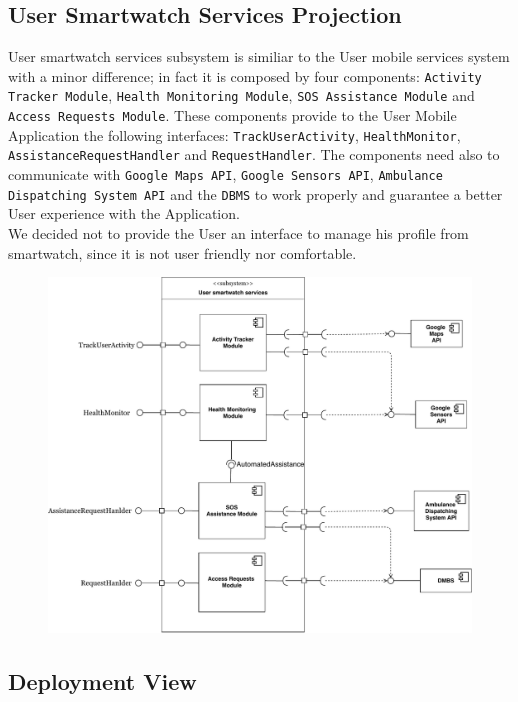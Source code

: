 \documentclass[12pt,a4paper]{article}
\begin{document}
		\subsection{User Smartwatch Services Projection}
	User smartwatch services subsystem is similiar to the User mobile services system with a minor difference; in fact it is composed by four components: \texttt{Activity Tracker Module}, \texttt{Health Monitoring Module}, \texttt{SOS Assistance Module} and \texttt{Access Requests Module}. These components provide to the User Mobile Application the following interfaces: \texttt{TrackUserActivity}, \texttt{HealthMonitor}, \texttt{AssistanceRequestHandler} and \texttt{RequestHandler}. The components need also to communicate with \texttt{Google Maps API}, \texttt{Google Sensors API}, \texttt{Ambulance Dispatching System API} and the \texttt{DBMS} to work properly and guarantee a better User experience with the Application.\\
	We decided not to provide the User an interface to manage his profile from smartwatch, since it is not user friendly nor comfortable.
	\begin{figure}[H]
		\centering
		\includegraphics[height=0.9\linewidth]{images/user_smartwatch_projection}
		\label{fig:userprojection}
	\end{figure}
	\newpage
	\subsection{Deployment View}
\end{document}
